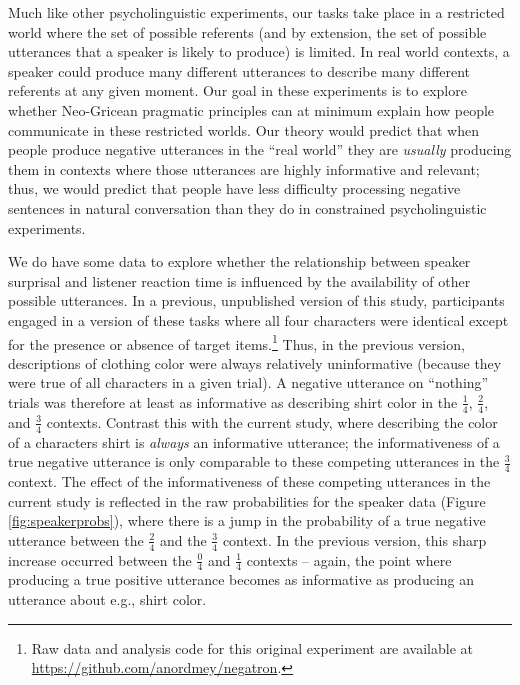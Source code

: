\documentclass[man, floatsintext, noapacite]{apa6}
\begin{document}
Much like other psycholinguistic experiments, our tasks take place in a restricted world where the set of possible referents (and by extension, the set of possible utterances that a speaker is likely to produce) is limited. In real world contexts, a speaker could produce many different utterances to describe many different referents at any given moment. Our goal in these experiments is to explore whether Neo-Gricean pragmatic principles can at minimum explain how people communicate in these restricted worlds. Our theory would predict that when people produce negative utterances in the ``real world'' they are \textit{usually} producing them in contexts where those utterances are highly informative and relevant; thus, we would predict that people have less difficulty processing negative sentences in natural conversation than they do in constrained psycholinguistic experiments.

We do have some data to explore whether the relationship between speaker surprisal and listener reaction time is influenced by the availability of other possible utterances. In a previous, unpublished version of this study, participants engaged in a version of these tasks where all four characters were identical except for the presence or absence of target items.\footnote{Raw data and analysis code for this original experiment are available at \url{https://github.com/anordmey/negatron}.} Thus, in the previous version, descriptions of clothing color were always relatively uninformative (because they were true of all characters in a given trial). A negative utterance on ``nothing'' trials was therefore at least as informative as describing shirt color in the $\frac{1}{4}$, $\frac{2}{4}$, and $\frac{3}{4}$ contexts. Contrast this with the current study, where describing the color of a characters shirt is \textit{always} an informative utterance; the informativeness of a true negative utterance is only comparable to these competing utterances in the $\frac{3}{4}$ context. The effect of the informativeness of these competing utterances in the current study is reflected in the raw probabilities for the speaker data (Figure \ref{fig:speakerprobs}), where there is a jump in the probability of a true negative utterance between the $\frac{2}{4}$ and the $\frac{3}{4}$ context. In the previous version, this sharp increase occurred between the $\frac{0}{4}$ and $\frac{1}{4}$ contexts -- again, the point where producing a true positive utterance becomes as informative as producing an utterance about e.g., shirt color. 
\end{document}

